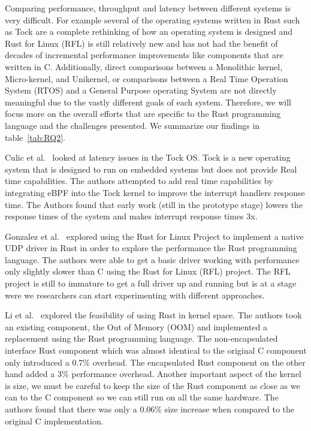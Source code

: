 \documentclass[sigconf]{acmart}
\begin{document}
Comparing performance, throughput and latency between different systems is very difficult. For
example several of the operating systems written in Rust such as Tock are a complete rethinking of
how an operating system is designed and Rust for Linux (RFL) is still relatively new and has not had
the benefit of decades of incremental performance improvements like components that are written in
C. Additionally, direct comparisons between a Monolithic kernel, Micro-kernel, and Unikernel, or
comparisons between a Real Time Operation System (RTOS) and a General Purpose operating System are
not directly meaningful due to the vastly different goals of each system. Therefore, we will focus
more on the overall efforts that are specific to the Rust programming language and the challenges
presented. We summarize our findings in table~\ref{tab:RQ2}.

Culic et al.~\cite{Culic2022-bk} looked at latency issues in the Tock OS. Tock is a new operating
system that is designed to run on embedded systems but does not provide Real time capabilities. The
authors attempted to add real time capabilities by integrating eBPF into the Tock kernel to improve
the interrupt handlers response time. The Authors found that early work (still in the prototype
stage) lowers the response times of the system and makes interrupt response times 3x.

Gonzalez et al.~\cite{Gonzalez2023-ek} explored using the Rust for Linux Project to implement a
native UDP driver in Rust in order to explore the performance the Rust programming language. The
authors were able to get a basic driver working with performance only slightly slower than C using
the Rust for Linux (RFL) project. The RFL project is still to immature to get a full driver up and
running but is at a stage were we researchers can start experimenting with different approaches.

Li et al.~\cite{Li2024-be} explored the feasibility of using Rust in kernel space. The authors took
an existing component, the Out of Memory (OOM) and implemented a replacement using the Rust
programming language. The non-encapsulated interface Rust component which was almost identical to
the original C component only introduced a 0.7\% overhead. The encapsulated Rust component on the
other hand added a 3\% performance overhead. Another important aspect of the kernel is size, we must
be careful to keep the size of the Rust component as close as we can to the C component so we can
still run on all the same hardware. The authors found that there was only a 0.06\% size increase
when compared to the original C implementation.
\end{document}
